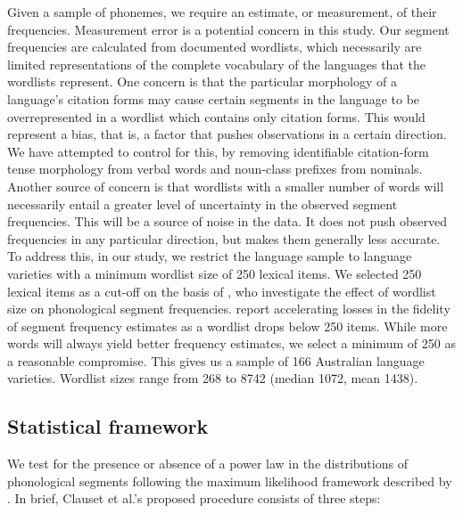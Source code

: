 Given a sample of phonemes, we require an estimate, or measurement, of their frequencies. Measurement error is a potential concern in this study. Our segment frequencies are calculated from documented wordlists, which necessarily are limited representations of the complete vocabulary of the languages that the wordlists represent. One concern is that the particular morphology of a language's citation forms may cause certain segments in the language to be overrepresented in a wordlist which contains only citation forms. This would represent a bias, that is, a factor that pushes observations in a certain direction. We have attempted to control for this, by removing identifiable citation-form tense morphology from verbal words and noun-class prefixes from nominals. Another source of concern is that wordlists with a smaller number of words will necessarily entail a greater level of uncertainty in the observed segment frequencies. This will be a source of noise in the data. It does not push observed frequencies in any particular direction, but makes them generally less accurate. To address this, in our study, we restrict the language sample to language varieties with a minimum wordlist size of 250 lexical items. We selected 250 lexical items as a cut-off on the basis of \textcite{dockum_swadesh_2019}, who investigate the effect of wordlist size on phonological segment frequencies. \textcite{dockum_swadesh_2019} report accelerating losses in the fidelity of segment frequency estimates as a wordlist drops below 250 items. While more words will always yield better frequency estimates, we select a minimum of 250 as a reasonable compromise. This gives us a sample of 166 Australian language varieties. Wordlist sizes range from 268 to 8742 (median 1072, mean 1438).

\hypertarget{phon-freq-statistical-framework}{%
\subsection{Statistical framework}\label{phon-freq-statistical-framework}}

We test for the presence or absence of a power law in the distributions of phonological segments following the maximum likelihood framework described by \textcite{clauset_power-law_2009}. In brief, Clauset et al.'s \autocite*[p.~663]{clauset_power-law_2009} proposed procedure consists of three steps:


